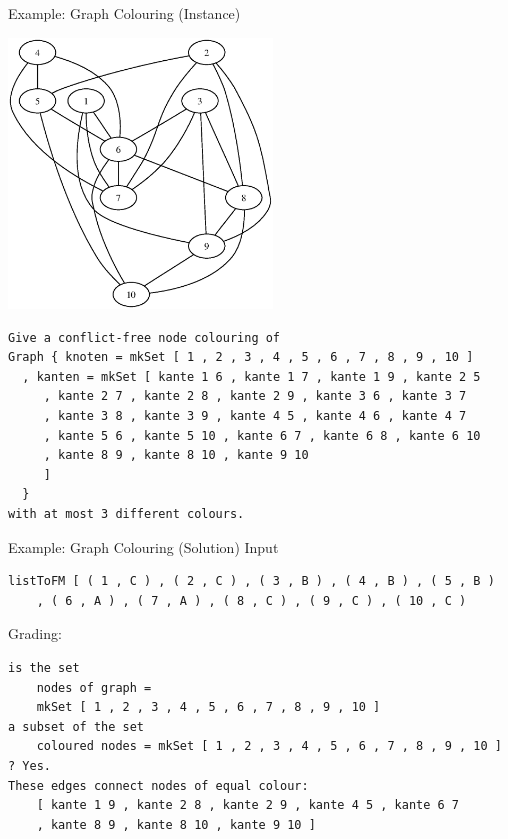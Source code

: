 \begin{slide}{Example: Graph Colouring (Instance)}

\begin{minipage}{0.4\textwidth}
\includegraphics[width=7cm]{536970904.Dot.eps}
\end{minipage}%
\begin{minipage}{0.5\textwidth}
\begin{small}
\begin{verbatim}
Give a conflict-free node colouring of
Graph { knoten = mkSet [ 1 , 2 , 3 , 4 , 5 , 6 , 7 , 8 , 9 , 10 ]
  , kanten = mkSet [ kante 1 6 , kante 1 7 , kante 1 9 , kante 2 5
     , kante 2 7 , kante 2 8 , kante 2 9 , kante 3 6 , kante 3 7
     , kante 3 8 , kante 3 9 , kante 4 5 , kante 4 6 , kante 4 7
     , kante 5 6 , kante 5 10 , kante 6 7 , kante 6 8 , kante 6 10
     , kante 8 9 , kante 8 10 , kante 9 10 
     ] 
  }
with at most 3 different colours.
\end{verbatim}
\end{small}  
\end{minipage}

\end{slide}

\begin{slide}{Example: Graph Colouring (Solution)}
Input
\begin{small}
\begin{verbatim}
listToFM [ ( 1 , C ) , ( 2 , C ) , ( 3 , B ) , ( 4 , B ) , ( 5 , B )
    , ( 6 , A ) , ( 7 , A ) , ( 8 , C ) , ( 9 , C ) , ( 10 , C ) 
\end{verbatim}
\end{small}
Grading:
\begin{small}
\begin{verbatim}
is the set
    nodes of graph =
    mkSet [ 1 , 2 , 3 , 4 , 5 , 6 , 7 , 8 , 9 , 10 ]
a subset of the set
    coloured nodes = mkSet [ 1 , 2 , 3 , 4 , 5 , 6 , 7 , 8 , 9 , 10 ]
? Yes.
These edges connect nodes of equal colour:
    [ kante 1 9 , kante 2 8 , kante 2 9 , kante 4 5 , kante 6 7
    , kante 8 9 , kante 8 10 , kante 9 10 ]
\end{verbatim}
\end{small}

\end{slide}

